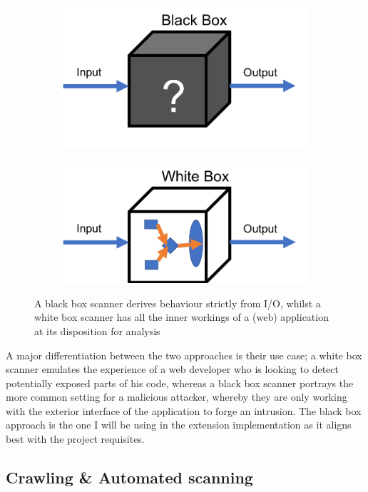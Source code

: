 \begin{figure}[h]
	\centering
	\begin{subfigure}{.5\textwidth}
		\centering
		\includegraphics[width=.8\linewidth]{images/black_box.png}
		\label{fig:blackBox}
	\end{subfigure}%
	\begin{subfigure}{.5\textwidth}
		\centering
		\includegraphics[width=.8\linewidth]{images/white_box.png}
		\label{fig:whiteBox}
	\end{subfigure}
	\caption{A black box scanner derives behaviour strictly from I/O, whilst a white box scanner has all the inner workings of a (web) application at its disposition for analysis}
	\label{fig:test}
\end{figure}


 A major differentiation between the two approaches is their use case; a white box scanner emulates the experience of a web developer who is looking to detect potentially exposed parts of his code, whereas a black box scanner portrays the more common setting for a malicious attacker, whereby they are only working with the exterior interface of the application to forge an intrusion. The black box approach is the one I will be using in the extension implementation as it aligns best with the project requisites.

\subsection{Crawling \& Automated scanning}
 
